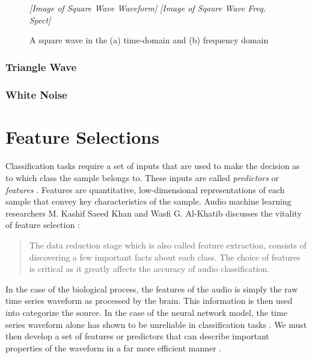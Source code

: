 \documentclass[12pt,letterpaper]{article}
\begin{document}
\begin{figure}[h]
\begin{center}
	\textit{[Image of Square Wave Waveform]}
	\textit{[Image of Sqaure Wave Freq. Spect]}
\end{center}
\caption{A square wave in the (a) time-domain and (b) frequency domain}
\label{fig-SquareWave}
\end{figure}


\subsubsection{Triangle Wave}


\subsubsection{White Noise}



\newpage
\section{Feature Selections}
\label{sec-Features}

\paragraph*{}Classification tasks require a set of inputs that are used to make the decision as to which class the sample belongs to. These inputs are called \textit{predictors} or \textit{features} \cite{James,Loy,Serizel}. Features are quantitative, low-dimensional representations of each sample that convey key characteristics of the sample. 
Audio machine learning researchers M. Kashif Saeed Khan and Wasfi G. Al-Khatib discusses the vitality of feature selection \cite{Khan}:
\begin{quote}
The data reduction stage which is also called feature extraction, consists of discovering a few important facts about each class. The choice of features is critical as it greatly affects the accuracy of audio classification. 
\end{quote}
In the case of the biological process, the features of the audio is simply the raw time series waveform as processed by the brain. This information is then used into categorize the source. In the case of the neural network model, the time series waveform alone has shown to be unreliable in classification tasks \cite{Serizel}. We must then develop a set of features or predictors that can describe important properties of the waveform in a far more efficient manner \cite{Goodfellow,James}.
\end{document}
